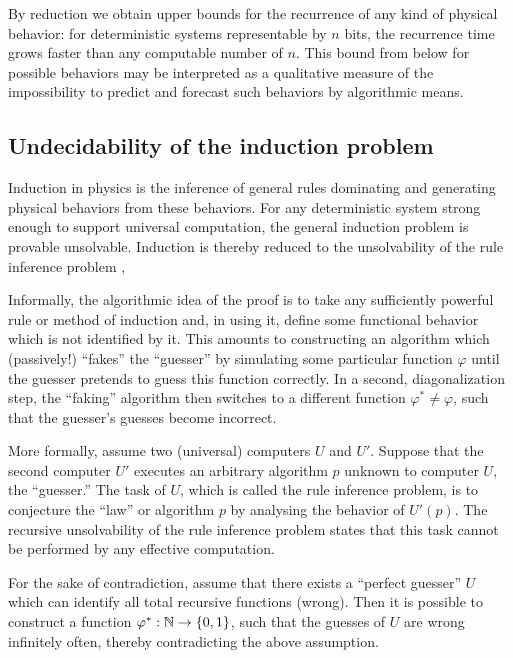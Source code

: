 \documentclass[rmp,amsfonts,showpacs,showkeys]{revtex4}
\begin{document}
By reduction we obtain upper bounds for the recurrence of any kind of physical behavior:
for deterministic systems representable by $n$ bits,
the recurrence time grows faster than any computable number
of $n$.
This bound from below for possible behaviors may be interpreted as a qualitative measure
of the impossibility to predict and forecast such behaviors by algorithmic means.


\subsection{Undecidability of the induction problem}

Induction in physics is the inference of general rules
dominating and generating physical behaviors from these behaviors.
For any deterministic system strong enough to support
universal computation, the general induction problem
is provable unsolvable.
Induction is thereby reduced to the unsolvability of
the rule inference problem \cite{go-67,blum75blum,angluin:83,ad-91,li:92},

Informally, the algorithmic idea of the proof is to take any sufficiently powerful
rule or method of induction and, in using it, define some
functional behavior which is not identified by it.
This amounts
to constructing an algorithm which
(passively!)
 ``fakes'' the ``guesser'' by simulating some particular function $\varphi $
until the guesser
pretends to guess this function correctly.
In a second,  diagonalization step, the ``faking'' algorithm then switches to a different
 function $\varphi^\ast  \neq \varphi $, such that the guesser's guesses become incorrect.


More formally, assume two (universal) computers $U$ and $U'$.
Suppose that the second computer $U'$ executes an arbitrary
algorithm $p$ unknown to computer $U$, the ``guesser.''
 The task of $U$,
 which is called the rule inference problem,
 is to conjecture the ``law'' or algorithm $p$ by analysing the
 behavior of $U'(p)$.
 The recursive unsolvability of the rule inference problem \cite{go-67} states that this task cannot be
 performed by any effective computation.

For the sake of contradiction, assume \cite{li:92}
that there exists a ``perfect guesser'' $U$ which can identify
all total recursive functions (wrong).
Then it is possible to construct a function $\varphi^\ast:{\Bbb N} \rightarrow
\{0,1\}$, such that the guesses of $U$ are wrong infinitely often,
thereby contradicting the above assumption.
\end{document}
